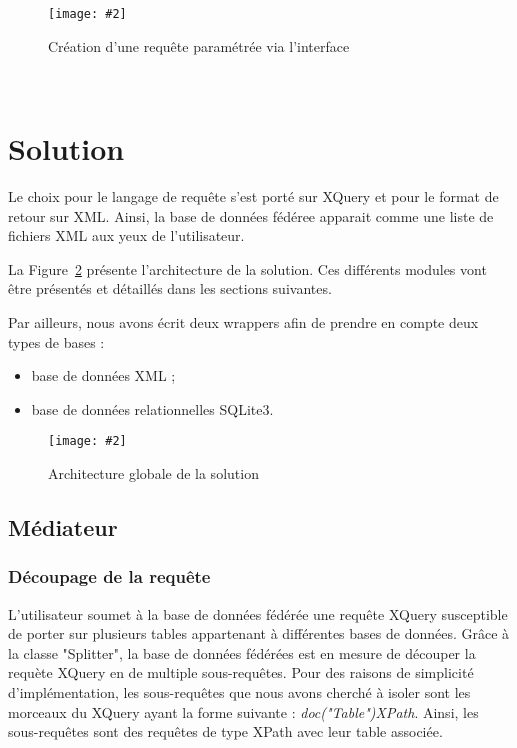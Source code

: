 \documentclass[a4paper,10pt]{article}
\newcommand{\fref}[1]{Figure~\ref{#1}}
\newcommand{\insertfigure}[4]{
\begin{figure}[ht!]
\begin{center}
\texttt{[image: \#2]}
\caption{#3}
\label{#4}
\end{center}
\end{figure}
}
\begin{document}
\insertfigure{0.8}{LiquidData.png}{Création d'une requête paramétrée via l'interface}{fig:liquiddata}







~~\\
\newpage
\section{Solution}

Le choix pour le langage de requête s'est porté sur XQuery et pour le format de retour sur XML. Ainsi, la base de données fédéree apparait comme une liste de fichiers XML aux yeux de l'utilisateur.


La \fref{fig:archiglo} présente l'architecture de la solution. Ces différents modules vont être présentés et détaillés dans les sections suivantes.

Par ailleurs, nous avons écrit deux wrappers afin de prendre en compte deux types de bases :
\begin{itemize}
\item base de données XML ;
\item base de données relationnelles SQLite3.
\end{itemize}


\insertfigure{0.6}{Archi_Global.jpg}{Architecture globale de la solution}{fig:archiglo}






\subsection{Médiateur}

\subsubsection{Découpage de la requête}

L'utilisateur soumet à la base de données fédérée une requête XQuery susceptible de porter sur plusieurs tables appartenant à différentes bases de données.
Grâce à la classe "Splitter", la base de données fédérées est en mesure de découper la requète XQuery en de multiple sous-requêtes. 
Pour des raisons de simplicité d'implémentation, les sous-requêtes que nous avons cherché à isoler sont les morceaux du XQuery ayant la forme suivante : \emph{doc("Table")XPath}.
Ainsi, les sous-requêtes sont des requêtes de type XPath avec leur table associée. 
\end{document}
